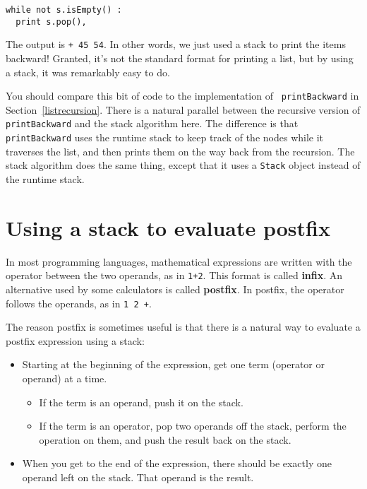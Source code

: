 \beforeverb
\begin{verbatim}
while not s.isEmpty() :
  print s.pop(),
\end{verbatim}
\afterverb
%
The output is {\tt + 45 54}.  In other words, we just used a stack
to print the items backward!  Granted, it's not the
standard format for printing a list, but by using a stack, it was
remarkably easy to do.

You should compare this bit of code to the implementation of {\tt
printBackward} in Section~\ref{listrecursion}.  There is a natural
parallel between the recursive version of {\tt printBackward} and the
stack algorithm here.  The difference is that {\tt printBackward} uses
the runtime stack to keep track of the nodes while it traverses the
list, and then prints them on the way back from the recursion.  The
stack algorithm does the same thing, except that it uses a {\tt Stack}
object instead of the runtime stack.



\section {Using a stack to evaluate postfix}

In most programming languages, mathematical expressions are
written with the operator between the two operands, as in
{\tt 1+2}.  This format is called {\bf infix}.  An alternative
used by some calculators is called {\bf postfix}.  In
postfix, the operator follows the operands, as in {\tt 1 2 +}.

The reason postfix is sometimes useful is that there is a
natural way to evaluate a postfix expression using a stack:

\begin{itemize}

\item Starting at the beginning of the expression, get one
term (operator or operand) at a time.

  \begin{itemize}

  \item If the term is an operand, push it on the stack.

  \item If the term is an operator, pop two operands off
  the stack, perform the operation on them, and push the
  result back on the stack.

  \end{itemize}

\item When you get to the end of the expression, there should
be exactly one operand left on the stack.  That operand is the
result.

\end{itemize}

